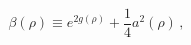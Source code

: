 \begin{equation}
\label{beta}
\beta(\rho) \equiv e^{2g(\rho)} +\frac{1}{4} a^2(\rho)\,,
\end{equation}

